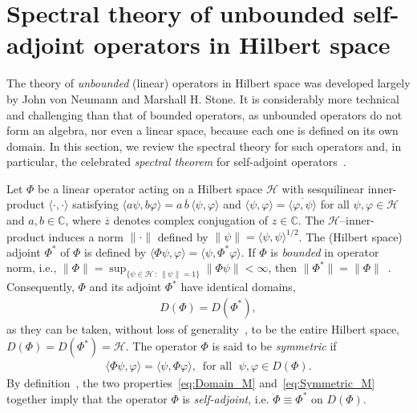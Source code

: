 \documentclass[leqno,onefignum,onetabnum]{siamltex1213}
\newcommand{\Hs}{\mathscr{H}}
\begin{document}


\appendix
%

\section{Spectral theory of unbounded self-adjoint operators in
  Hilbert space} \label{sec:Spectral_Theory}    
%
The theory of \emph{unbounded} (linear) operators in Hilbert
space was developed largely by John von Neumann and Marshall H. Stone. It
is considerably more technical and challenging than that of bounded
operators, as unbounded operators do not form an algebra, nor even a
linear space, because each one is defined on its own domain. In this
section, we review the spectral theory for such operators and, in
particular, the celebrated \emph{spectral theorem} for self-adjoint
operators~\cite{Reed-1980,Stone:64}.



Let $\Phi$ be a linear operator acting on a Hilbert space $\Hs$ with
sesquilinear inner-product $\langle\cdot,\cdot\rangle$ satisfying
$\langle a\psi,b\varphi\rangle=a\,\overline{b}\,\langle\psi,\varphi\rangle$ and $\langle\psi,\varphi\rangle=\overline{\langle\varphi,\psi\rangle}$ for all
$\psi,\varphi\in\Hs$ and $a,b\in\mathbb{C}$, where $\overline{z}$ denotes complex
conjugation of $z\in\mathbb{C}$. The $\Hs$--inner-product induces a norm $\|\cdot\|$
defined by $\|\psi\|=\langle\psi,\psi\rangle^{1/2}$. The (Hilbert space) adjoint $\Phi^*$ of $\Phi$
is defined by $\langle\Phi\psi,\varphi\rangle=\langle\psi,\Phi^*\varphi\rangle$. If $\Phi$ is \emph{bounded}
in operator norm,
i.e., $\|\Phi\|=\sup_{\{\psi\in\Hs \,:\, \|\psi\|=1\}}\|\Phi\psi\|<\infty$, then
$\|\Phi^*\|=\|\Phi\|$~\cite{Reed-1980}. Consequently, $\Phi$ and its adjoint $\Phi^*$
have identical domains,          
%
\begin{align}\label{eq:Domain_M}
  D(\Phi)=D(\Phi^*),
\end{align}
%
as they can be taken, without loss of
generality~\cite{Stakgold:BVP:2000}, to be the entire Hilbert space,
$D(\Phi)=D(\Phi^*)=\Hs$. The operator $\Phi$ is said to be \emph{symmetric}
if~\cite{Reed-1980}     
% 
\begin{align}\label{eq:Symmetric_M}
  \langle\Phi\psi,\varphi\rangle=\langle\psi,\Phi\varphi\rangle,
  \, \text{ for all } \; \psi,\varphi\in D(\Phi).
\end{align}
%
By definition~\cite{Reed-1980,Stone:64}, the two
properties~\eqref{eq:Domain_M} and~\eqref{eq:Symmetric_M} together
imply that the operator $\Phi$ is \emph{self-adjoint}, i.e. $\Phi\equiv\Phi^*$
on $D(\Phi)$. 
\end{document}
